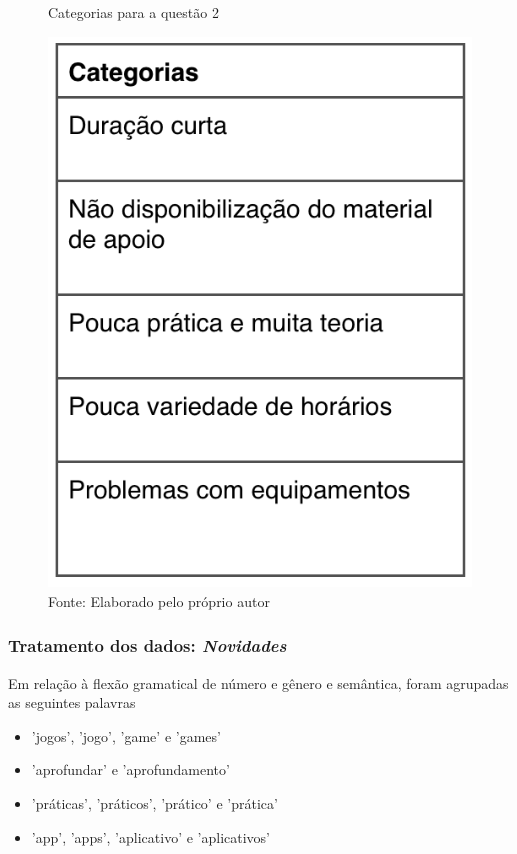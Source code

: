 \begin{figure}[H]
\caption{Categorias para a questão 2}
\centerline{\includegraphics[scale=0.75]{img/categoriasmelhorias}}
\label{fig:categoriasmelhorias}
\caption* {Fonte: Elaborado pelo próprio autor}
\end{figure}

\subsubsection*{Tratamento dos dados: \textit{Novidades}}

Em relação à flexão gramatical de número e gênero e semântica, foram agrupadas as seguintes palavras

\begin{itemize}
\item 'jogos', 'jogo', 'game' e 'games'
\item 'aprofundar' e 'aprofundamento'
\item 'práticas', 'práticos', 'prático' e 'prática'
\item 'app', 'apps', 'aplicativo' e 'aplicativos'
\end{itemize}

